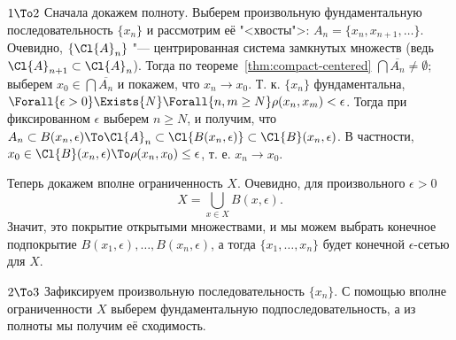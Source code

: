 \documentclass[main]{subfiles}
\begin{document}
\begin{itemproof}
\item[$1 \To 2$]
  Сначала докажем полноту.
  Выберем произвольную фундаментальную последовательность
  \( \{ x_n \} \) и рассмотрим её "<хвосты">:
  \( A_n = \{ x_n, x_{n+1}, \dots \} \).
  Очевидно, \( \{ \Cl{A}_n \} \) "---
  центрированная система замкнутых множеств
  (ведь \( \Cl{A}_{n+1} \subset \Cl{A}_n \)).
  Тогда по теореме~\ref{thm:compact-centered}
  \( \bigcap \overline{A_n} \ne \emptyset \);
  выберем \( x_0 \in \bigcap \overline{A_n} \) и покажем,
  что \( x_n \to x_0 \).
  Т. к. \( \{ x_n \} \) фундаментальна, 
  \( \Forall{\epsilon > 0} \Exists{N} \Forall{n, m \ge N}
  \rho(x_n, x_m) < \epsilon \).
  Тогда при фиксированном \( \epsilon \) выберем \( n \ge N \),
  и получим, что \( A_n \subset B(x_n, \epsilon) \To
  \Cl{A}_n \subset \Cl{B(x_n, \epsilon)}
  \subset \Cl{B}(x_n, \epsilon) \). В частности,
  \( x_0 \in \Cl{B}(x_n, \epsilon) \To \rho(x_n, x_0) \le \epsilon \),
  т. е. \( x_n \to x_0 \).

  Теперь докажем вполне ограниченность \( X \).
  Очевидно, для произвольного \( \epsilon > 0 \)
  \[ X = \bigcup_{x \in X} B(x, \epsilon). \]
  Значит, это покрытие открытыми множествами,
  и мы можем выбрать конечное
  подпокрытие \( B(x_1, \epsilon), \dots, B(x_n, \epsilon) \),
  а тогда \( \{ x_1, \dots, x_n \} \)
  будет конечной \( \epsilon \)-сетью для \( X \).
\item[$2 \To 3$]
  Зафиксируем произвольную последовательность \( \{ x_n \} \).
  С помощью вполне ограниченности \( X \) выберем фундаментальную
  подпоследовательность, а из полноты мы получим её сходимость.


\end{itemproof}
\end{document}
